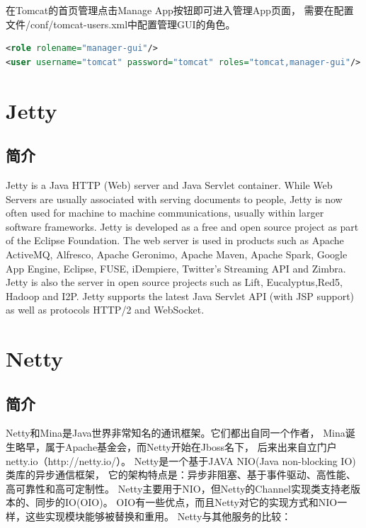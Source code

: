 \documentclass{book}
\begin{document}
在Tomcat的首页管理点击Manage App按钮即可进入管理App页面，
需要在配置文件/conf/tomcat-users.xml中配置管理GUI的角色。

\begin{lstlisting}[language=XML]
<role rolename="manager-gui"/>
<user username="tomcat" password="tomcat" roles="tomcat,manager-gui"/>
\end{lstlisting}

\section{Jetty}

\subsection{简介}

Jetty is a Java HTTP (Web) server and Java Servlet container. 
While Web Servers are usually associated with serving documents to people, 
Jetty is now often used for machine to machine communications, 
usually within larger software frameworks. 
Jetty is developed as a free and open source project as part of the Eclipse Foundation. 
The web server is used in products such as Apache ActiveMQ, Alfresco, Apache Geronimo, 
Apache Maven, Apache Spark, Google App Engine, Eclipse, FUSE, iDempiere, 
Twitter's Streaming API and Zimbra. 
Jetty is also the server in open source projects such as Lift, Eucalyptus,Red5, Hadoop and I2P. 
Jetty supports the latest Java Servlet API (with JSP support) as well as protocols HTTP/2 and WebSocket.

\section{Netty}

\subsection{简介}

Netty和Mina是Java世界非常知名的通讯框架。它们都出自同一个作者，
Mina诞生略早，属于Apache基金会，而Netty开始在Jboss名下，
后来出来自立门户netty.io（http://netty.io/）。
Netty是一个基于JAVA NIO(Java non-blocking IO)类库的异步通信框架，
它的架构特点是：异步非阻塞、基于事件驱动、高性能、高可靠性和高可定制性。
Netty主要用于NIO，但Netty的Channel实现类支持老版本的、同步的IO(OIO)。
OIO有一些优点，而且Netty对它的实现方式和NIO一样，这些实现模块能够被替换和重用。
Netty与其他服务的比较：
\end{document}
